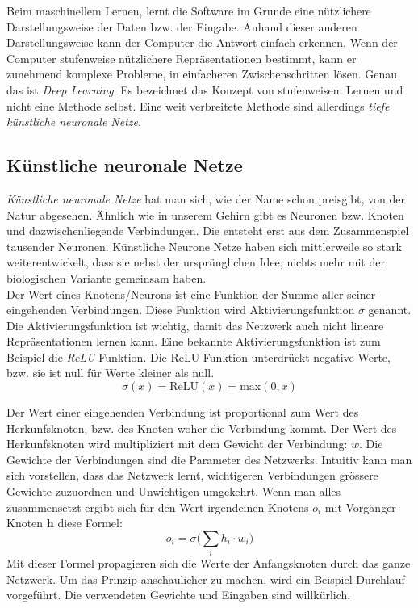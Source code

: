 Beim maschinellem Lernen, lernt die Software im Grunde eine nützlichere Darstellungsweise der Daten bzw. der Eingabe. Anhand dieser anderen Darstellungsweise kann der Computer die Antwort einfach erkennen. Wenn der Computer stufenweise nützlichere Repräsentationen bestimmt, kann er zunehmend komplexe Probleme, in einfacheren Zwischenschritten lösen. Genau das ist \textit{Deep Learning}. Es bezeichnet das Konzept von stufenweisem Lernen und nicht eine Methode selbst. Eine weit verbreitete Methode sind allerdings \textit{tiefe künstliche neuronale Netze}.\parencite[vgl.][]{chollet} 

\subsection{Künstliche neuronale Netze}

\textit{Künstliche neuronale Netze} hat man sich, wie der Name schon preisgibt, von der Natur abgesehen. Ähnlich wie in unserem Gehirn gibt es Neuronen bzw. Knoten und dazwischenliegende Verbindungen. Die  entsteht erst aus dem Zusammenspiel tausender Neuronen. Künstliche Neurone Netze haben sich mittlerweile so stark weiterentwickelt, dass sie nebst der ursprünglichen Idee, nichts mehr mit der biologischen Variante gemeinsam haben. \\

Der Wert eines Knotens/Neurons ist eine Funktion der Summe aller seiner eingehenden Verbindungen. Diese Funktion wird Aktivierungsfunktion $\sigma$ genannt. Die Aktivierungsfunktion ist wichtig, damit das Netzwerk auch nicht lineare Repräsentationen lernen kann. Eine bekannte Aktivierungsfunktion ist zum Beispiel die \textit{ReLU} Funktion. Die ReLU Funktion unterdrückt negative Werte, bzw. sie ist null für Werte kleiner als null.  \parencite{neuronale_netze} 
$$\sigma(x) = \text{ReLU}(x) = \text{max}(0, x)$$

Der Wert einer eingehenden Verbindung ist proportional zum Wert des Herkunfsknoten, bzw. des Knoten woher die Verbindung kommt. Der Wert des Herkunfsknoten wird multipliziert mit dem Gewicht der Verbindung: $w$. Die Gewichte der Verbindungen sind die Parameter des Netzwerks. Intuitiv kann man sich vorstellen, dass das Netzwerk lernt, wichtigeren Verbindungen grössere Gewichte zuzuordnen und Unwichtigen umgekehrt. Wenn man alles zusammensetzt ergibt sich für den Wert irgendeinen Knotens $o_i$ mit Vorgänger-Knoten $\boldsymbol{h}$ diese Formel:
$$ o_i = \sigma\Big(\sum_i h_i \cdot w_{i}\Big)$$
Mit dieser Formel propagieren sich die Werte der Anfangsknoten durch das ganze Netzwerk. Um das Prinzip anschaulicher zu machen, wird ein Beispiel-Durchlauf vorgeführt. Die verwendeten Gewichte und Eingaben sind willkürlich.


